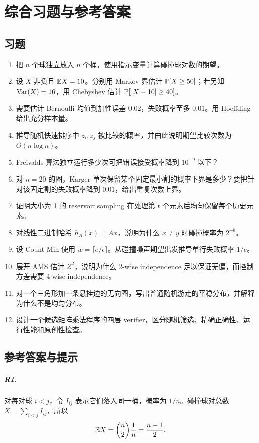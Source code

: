 \chapter{综合习题与参考答案}

\section{习题}

\begin{enumerate}[label=\textbf{R\arabic*.}]
  \item 把 $n$ 个球独立放入 $n$ 个桶，使用指示变量计算碰撞球对数的期望。
  \item 设 $X$ 非负且 $\mathbb{E} X=10$。分别用 Markov 界估计 $\mathbb{P}[X\ge50]$；若另知 $\operatorname{Var}(X)=16$，用 Chebyshev 估计 $\mathbb{P}[|X-10|\ge40]$。
  \item 需要估计 Bernoulli 均值到加性误差 $0.02$，失败概率至多 $0.01$。用 Hoeffding 给出充分样本量。
  \item 推导随机快速排序中 $z_i,z_j$ 被比较的概率，并由此说明期望比较次数为 $O(n\log n)$。
  \item Freivalds 算法独立运行多少次可把错误接受概率降到 $10^{-9}$ 以下？
  \item 对 $n=20$ 的图，Karger 单次保留某个固定最小割的概率下界是多少？要把针对该固定割的失败概率降到 $0.01$，给出重复次数上界。
  \item 证明大小为 1 的 reservoir sampling 在处理第 $t$ 个元素后均匀保留每个历史元素。
  \item 对线性二进制哈希 $h_A(x)=Ax$，说明为什么 $x\ne y$ 时碰撞概率为 $2^{-b}$。
  \item 设 Count-Min 使用 $w=\lceil e/\epsilon\rceil$。从碰撞噪声期望出发推导单行失败概率 $1/e$。
  \item 展开 AMS 估计 $Z^2$，说明为什么 2-wise independence 足以保证无偏，而控制方差需要 4-wise independence。
  \item 对一个三角形加一条悬挂边的无向图，写出普通随机游走的平稳分布，并解释为什么不是均匀分布。
  \item 设计一个候选矩阵乘法程序的四层 verifier，区分随机筛选、精确正确性、运行性能和原创性检查。
\end{enumerate}

\section{参考答案与提示}

\paragraph{R1.}
对每对球 $i<j$，令 $I_{ij}$ 表示它们落入同一桶，概率为 $1/n$。碰撞球对总数 $X=\sum_{i<j}I_{ij}$，所以
\[
\mathbb{E} X=\binom n2\frac1n=\frac{n-1}{2}.
\]

